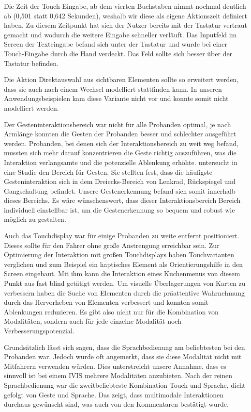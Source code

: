 {Die Zeit der Touch-Eingabe, ab dem vierten Buchstaben nimmt nochmal deutlich ab (0,501 statt 0,642 Sekunden), weshalb wir diese als eigene Aktionszeit definiert haben.
Zu diesem Zeitpunkt hat sich der Nutzer bereits mit der Tastatur vertraut gemacht und wodurch die weitere Eingabe schneller verläuft.
Das Inputfeld im Screen der Texteingabe befand sich unter der Tastatur und wurde bei einer Touch-Eingabe durch die Hand verdeckt.
Das Feld sollte sich besser über der Tastatur befinden.

Die Aktion Direktauswahl aus sichtbaren Elementen sollte so erweitert werden, dass sie auch nach einem Wechsel modelliert stattfinden kann.
In unseren Anwendungsbeispielen kam diese Variante nicht vor und konnte somit nicht modelliert werden.

Der Gesteninteraktionsbereich war nicht für alle Probanden optimal, je nach Armlänge konnten die Gesten der Probanden besser und schlechter ausgeführt werden.
Probanden, bei denen sich der Interaktionsbereich zu weit weg befand, mussten sich mehr darauf konzentrieren die Geste richtig auszuführen, was die Interaktion verlangsamte und die potenzielle Ablenkung erhöhte.
\citet{Riener:2013:SIG} untersucht in eine Studie den Bereich für Gesten.
Sie stellten fest, dass die häufigste Gesteninteraktion sich in dem Dreiecks-Bereich von Lenkrad, Rückspiegel und Gangschaltung befindet.
Unsere Gestenerkennung befand sich somit innerhalb dieses Bereichs.
Es wäre wünschenswert, dass dieser Interaktionsbereich Bereich individuell einstellbar ist, um die Gestenerkennung so bequem und robust wie möglich zu gestalten.

Auch das Touchdisplay war für einige Probanden zu weite entfernt positioniert.
Dieses sollte für den Fahrer ohne große Anstrengung erreichbar sein.
Zur Optimierung der Interaktion mit großen Touchdisplays haben \citet{Rumelin:2013} Touchvarianten verglichen und zum Beispiel ein haptisches Element als Orientierungshilfe in den Screen eingebaut.
Mit ihm kann die Interaktion eines Kuchenmenüs von diesem Punkt aus fast blind getätigt werden.
Um visuelle Überlagerungen von Karten zu verbessern haben \citet{lee2013saliency} die Suche von Elementen durch die präattentive Wahrnehmung durch das Hervorheben von Elementen verbessert und konnten somit Ablenkungen reduzieren.
Es gibt also nicht nur für die Kombination von Modalitäten, sondern auch für jede einzelne Modalität noch Verbesserungspotenzial.

Grundsätzlich lässt sich sagen, dass die Sprachbedienung am beliebtesten bei den Probanden war.
Jedoch wurde oft angemerkt, dass sie diese Modalität nicht mit Mitfahrern verwenden würden.
Dies unterstreicht unsere Annahme, dass es sinnvoll ist bei einem IVIS mehrere Modalitäten anzubieten.
Nach der reinen Sprachbedienung war die zweitbeliebteste Kombination Touch und Sprache, dicht gefolgt von Geste und Sprache.
Das zeigt, dass multimodale Interaktionen durchaus gewünscht sind, was auch von den Kommentaren bestätigt wurde.

}
